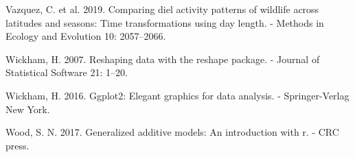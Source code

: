 \documentclass[]{elsarticle} %
\begin{document}
\leavevmode\hypertarget{ref-https:ux2fux2fdoi.orgux2f10.1111ux2f2041-210X.13290}{}%
Vazquez, C. et al. 2019. Comparing diel activity patterns of wildlife across latitudes and seasons: Time transformations using day length. - Methods in Ecology and Evolution 10: 2057--2066.

\leavevmode\hypertarget{ref-reshape}{}%
Wickham, H. 2007. Reshaping data with the reshape package. - Journal of Statistical Software 21: 1--20.

\leavevmode\hypertarget{ref-ggplot2}{}%
Wickham, H. 2016. Ggplot2: Elegant graphics for data analysis. - Springer-Verlag New York.

\leavevmode\hypertarget{ref-wood2017}{}%
Wood, S. N. 2017. Generalized additive models: An introduction with r. - CRC press.
\end{document}
